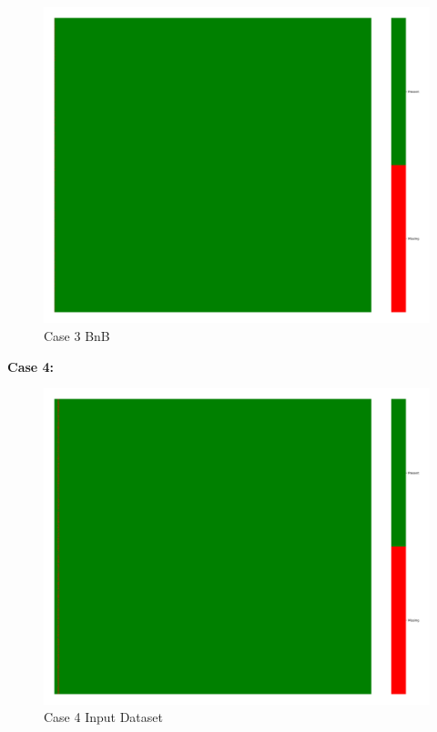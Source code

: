 \documentclass[a4paper,12pt]{article}
\begin{document}
\begin{figure}[H]
    \includegraphics[width=\linewidth]{case3_bnb_heatmap_cleaned.png}
    \caption*{Case 3 BnB}
\end{figure}

\textbf{Case 4:}
\begin{figure}[H]
    \centering
    \includegraphics[width=\linewidth]{case4_heatmap_erased.png}
    \caption*{Case 4 Input Dataset}
\end{figure}
\end{document}
